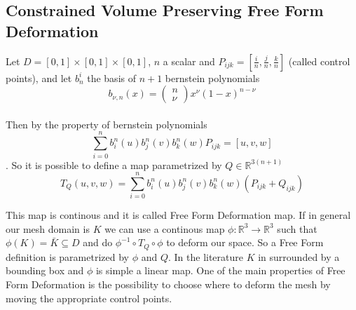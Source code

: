 \documentclass{article}
\begin{document}
\subsection{Constrained Volume Preserving Free Form Deformation}
Let $D=[0,1]\times[0,1]\times[0,1]$, $n$ a scalar and $P_{ijk}=\left[\frac{i}{n},\frac{j}{n},\frac{k}{n}\right]$ (called control points), and let $b^{i}_{n}$ the basis of $n+1$ bernstein polynomials
$$b_{\nu, n}(x)=\left(\begin{array}{l}
n \\
\nu
\end{array}\right) x^\nu(1-x)^{n-\nu}$$\\
Then by the property of bernstein polynomials
$$\sum_{i=0}^{n}b_{i}^{n}(u)b_{j}^{n}(v)b_{k}^{n}(w)P_{ijk}=\left[u,v,w\right]$$.
So it is possible to define a map parametrized by $Q\in\mathbb{R}^{3(n+1)}$
$$T_{Q}(u,v,w)=\sum_{i=0}^{n}b_{i}^{n}(u)b_{j}^{n}(v)b_{k}^{n}(w)(P_{ijk}+Q_{ijk})$$

This map is continous and it is called Free Form Deformation map.
If in general our mesh domain is $K$ we can use a continous map $\phi: \mathbb{R}^{3} \rightarrow \mathbb{R}^{3}$ such that $\phi(K)=\bar{K}\subseteq D$ and do $\phi^{-1}\circ T_{Q} \circ \phi$ to deform our space. So a Free Form definition is parametrized by $\phi$ and $Q$. In the literature $K$ in surrounded by a bounding box and $\phi$ is simple a linear map. One of the main properties of Free Form Deformation is the possibility to choose where to deform the mesh by moving the appropriate control points. 
\end{document}
